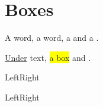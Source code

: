 \documentclass[letterpaper]{article}
\date{}
\begin{document}
\section*{Boxes}
A  word, a  word, a
 and a .

\underline{Under} text, \colorbox{yellow}{a box} and .

Left\hrulefill Right

Left\dotfill Right
\end{document}
